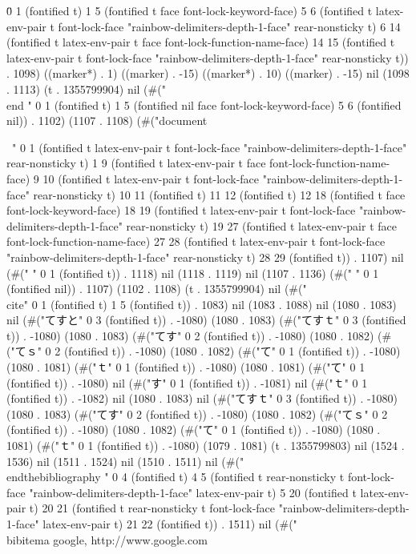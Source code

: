\" 0 1 (fontified t) 1 5 (fontified t face font-lock-keyword-face) 5 6 (fontified t latex-env-pair t font-lock-face "rainbow-delimiters-depth-1-face" rear-nonsticky t) 6 14 (fontified t latex-env-pair t face font-lock-function-name-face) 14 15 (fontified t latex-env-pair t font-lock-face "rainbow-delimiters-depth-1-face" rear-nonsticky t)) . 1098) ((marker*) . 1) ((marker) . -15) ((marker*) . 10) ((marker) . -15) nil (1098 . 1113) (t . 1355799904) nil (#("
\\end
" 0 1 (fontified t) 1 5 (fontified nil face font-lock-keyword-face) 5 6 (fontified nil)) . 1102) (1107 . 1108) (#("{document}

\
" 0 1 (fontified t latex-env-pair t font-lock-face "rainbow-delimiters-depth-1-face" rear-nonsticky t) 1 9 (fontified t latex-env-pair t face font-lock-function-name-face) 9 10 (fontified t latex-env-pair t font-lock-face "rainbow-delimiters-depth-1-face" rear-nonsticky t) 10 11 (fontified t) 11 12 (fontified t) 12 18 (fontified t face font-lock-keyword-face) 18 19 (fontified t latex-env-pair t font-lock-face "rainbow-delimiters-depth-1-face" rear-nonsticky t) 19 27 (fontified t latex-env-pair t face font-lock-function-name-face) 27 28 (fontified t latex-env-pair t font-lock-face "rainbow-delimiters-depth-1-face" rear-nonsticky t) 28 29 (fontified t)) . 1107) nil (#(" " 0 1 (fontified t)) . 1118) nil (1118 . 1119) nil (1107 . 1136) (#("
" 0 1 (fontified nil)) . 1107) (1102 . 1108) (t . 1355799904) nil (#("\\cite" 0 1 (fontified t) 1 5 (fontified t)) . 1083) nil (1083 . 1088) nil (1080 . 1083) nil (#("てすと" 0 3 (fontified t)) . -1080) (1080 . 1083) (#("てすｔ" 0 3 (fontified t)) . -1080) (1080 . 1083) (#("てす" 0 2 (fontified t)) . -1080) (1080 . 1082) (#("てｓ" 0 2 (fontified t)) . -1080) (1080 . 1082) (#("て" 0 1 (fontified t)) . -1080) (1080 . 1081) (#("ｔ" 0 1 (fontified t)) . -1080) (1080 . 1081) (#("て" 0 1 (fontified t)) . -1080) nil (#("す" 0 1 (fontified t)) . -1081) nil (#("ｔ" 0 1 (fontified t)) . -1082) nil (1080 . 1083) nil (#("てすｔ" 0 3 (fontified t)) . -1080) (1080 . 1083) (#("てす" 0 2 (fontified t)) . -1080) (1080 . 1082) (#("てｓ" 0 2 (fontified t)) . -1080) (1080 . 1082) (#("て" 0 1 (fontified t)) . -1080) (1080 . 1081) (#("ｔ" 0 1 (fontified t)) . -1080) (1079 . 1081) (t . 1355799803) nil (1524 . 1536) nil (1511 . 1524) nil (1510 . 1511) nil (#("\\end{thebibliography}
" 0 4 (fontified t) 4 5 (fontified t rear-nonsticky t font-lock-face "rainbow-delimiters-depth-1-face" latex-env-pair t) 5 20 (fontified t latex-env-pair t) 20 21 (fontified t rear-nonsticky t font-lock-face "rainbow-delimiters-depth-1-face" latex-env-pair t) 21 22 (fontified t)) . 1511) nil (#("\\bibitem{a} google, http://www.google.com
